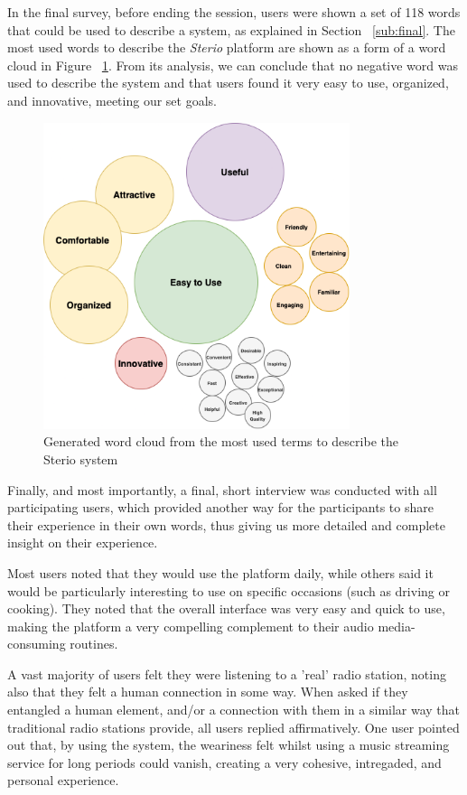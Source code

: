 {In the final survey, before ending the session, users were shown a set of 118 words that could be used to describe a system, as explained in Section ~\ref{sub:final}. The most used words to describe the \textit{Sterio} platform are shown as a form of a word cloud in Figure ~\ref{fig:wordcloud}. From its analysis, we can conclude that no negative word was used to describe the system and that users found it very easy to use, organized, and innovative, meeting our set goals.


\begin{figure}[h]
\centering
\includegraphics[width=0.8\textwidth]{./Images/wordcloud.png}
\caption{Generated word cloud from the most used terms to describe the Sterio system}
\label{fig:wordcloud}
\end{figure}

Finally, and most importantly, a final, short interview was conducted with all participating users, which provided another way for the participants to share their experience in their own words, thus giving us more detailed and complete insight on their experience.

Most users noted that they would use the platform daily, while others said it would be particularly interesting to use on specific occasions (such as driving or cooking). They noted that the overall interface was very easy and quick to use, making the platform a very compelling complement to their audio media-consuming routines. 

A vast majority of users felt they were listening to a 'real' radio station, noting also that they felt a human connection in some way. When asked if they entangled a human element, and/or a connection with them in a similar way that traditional radio stations provide, all users replied affirmatively. One user pointed out that, by using the system, the weariness felt whilst using a music streaming service for long periods could vanish, creating a very cohesive, intregaded, and personal experience. 

}
